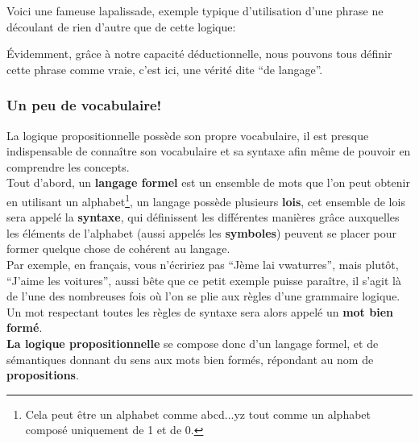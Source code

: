 \documentclass[a4paper, 12pt]{article}
\numberwithin{equation}{subsection}
\begin{document}
     Voici une fameuse lapalissade, exemple typique d'utilisation d'une phrase ne découlant de rien d'autre que de cette logique:
  \begin{center}
     
  \end{center}
  Évidemment, grâce à notre capacité déductionnelle, nous pouvons tous définir cette phrase comme vraie, c'est ici, une vérité dite ``de  langage''.\\

  \subsubsection{Un peu de vocabulaire!}
  La logique propositionnelle possède son propre vocabulaire, il est presque indispensable de connaître son vocabulaire et sa syntaxe afin même de  pouvoir en comprendre les concepts.\\

  Tout d'abord, un {\bf langage formel} est un ensemble de mots que l'on peut obtenir en utilisant un alphabet\footnote{Cela peut être un alphabet comme abcd...yz tout comme un alphabet composé uniquement de 1 et de 0.}, un langage possède plusieurs {\bf lois}, cet ensemble de lois sera appelé la {\bf syntaxe}, qui définissent les différentes manières grâce auxquelles les éléments de l'alphabet (aussi appelés  les {\bf symboles}) peuvent se placer pour former quelque chose de cohérent au langage.\\

  Par exemple, en français, vous n'écririez pas ``Jème lai vwaturres'', mais plutôt, ``J'aime les voitures'', aussi bête que ce petit exemple puisse paraître, il s'agit là de l'une des nombreuses fois où l'on se plie aux règles d'une grammaire logique. \\

  Un mot respectant toutes les règles de syntaxe sera alors appelé un {\bf mot bien formé}. \\

  {\bf La logique propositionnelle} se compose donc d'un langage formel, et de sémantiques donnant du sens aux mots bien formés, répondant au nom de {\bf propositions}. \\
\end{document}
